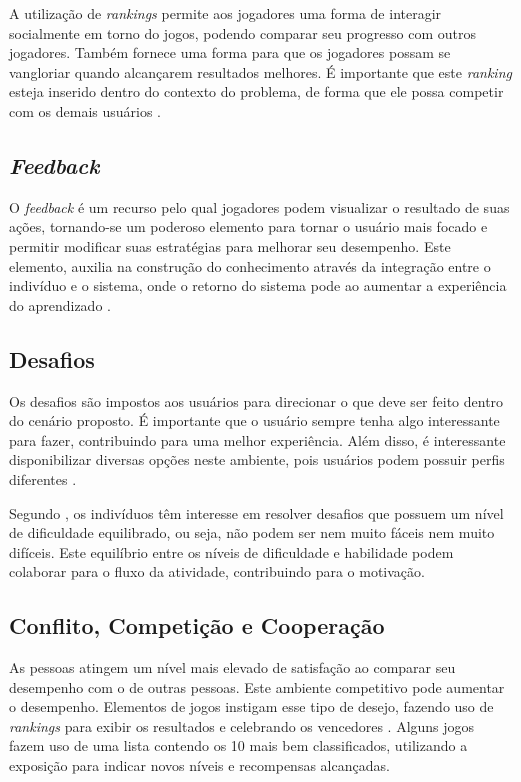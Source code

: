 \documentclass[
	12pt,				%
	oneside,			%
	a4paper,			%
	english,			%
	french,				%
	spanish,			%
	brazil,				%
	]{abntex2}
\begin{document}
A utilização de \textit{rankings} permite aos jogadores uma forma de interagir socialmente em torno do jogos, podendo comparar seu progresso com outros jogadores. Também fornece uma forma para que os jogadores possam se vangloriar quando alcançarem resultados melhores. É importante que este \textit{ranking} esteja inserido dentro do contexto do problema, de forma que ele possa competir com os demais usuários \cite{quadros2016gamificaccao}.
    
\subsection{\textit{Feedback}}            

O \textit{feedback} é um recurso pelo qual jogadores podem visualizar o resultado de suas ações, tornando-se um poderoso elemento para tornar o usuário mais focado e permitir modificar suas estratégias para melhorar seu desempenho. Este elemento, auxilia na construção do conhecimento através da integração entre o indivíduo e o sistema, onde o retorno do sistema pode ao aumentar a experiência do aprendizado \cite{fardo2013gamificaccao}.
    
\subsection{Desafios}                

Os desafios são impostos aos usuários para direcionar o que deve ser feito dentro do cenário proposto. É importante que o usuário sempre tenha algo interessante para fazer, contribuindo para uma melhor experiência. Além disso, é interessante disponibilizar diversas opções neste ambiente, pois usuários podem possuir perfis diferentes \cite{fardo2013gamificaccao}.

Segundo \citet{busarello2016gamificaccao}, os indivíduos têm interesse em resolver desafios que possuem um nível de dificuldade equilibrado, ou seja, não podem ser nem muito fáceis nem muito difíceis. Este equilíbrio entre os níveis de dificuldade e habilidade podem colaborar para o fluxo da atividade, contribuindo para o motivação.
    
\subsection{Conflito, Competição e Cooperação}                    

As pessoas atingem um nível mais elevado de satisfação ao comparar seu desempenho com o de outras pessoas. Este ambiente competitivo pode aumentar o desempenho. Elementos de jogos instigam esse tipo de desejo, fazendo uso de \textit{rankings} para exibir os resultados e celebrando os vencedores  \cite{bunchball2016gamification}. Alguns jogos fazem uso de uma lista contendo os 10 mais bem classificados, utilizando a exposição para indicar novos níveis e recompensas alcançadas.
\end{document}
